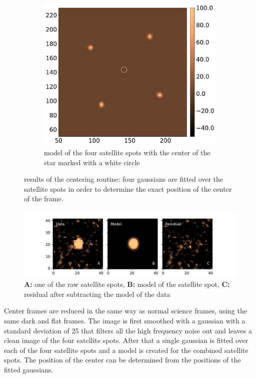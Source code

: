 \documentclass[twoside,single,12pt]{lion-msc}
\begin{document}
\begin{figure}[!t]
\begin{subfigure}{.48\textwidth}
  \includegraphics[width=1\linewidth]{centermodel}%
  \caption{model of the four satellite spots with the center of the star marked with a white circle}
  \label{fig:centermodel}
\end{subfigure}
\caption{results of the centering routine: four gaussians are fitted over the satellite spots in order to determine the exact position of the center of the frame.}
\end{figure}

\begin{figure}[!b]
\centering
\vspace{-0.5cm}
\includegraphics[trim={2cm 0cm 0cm 0cm},clip,width = 1.1\textwidth]{resultmodel}
\caption{\textbf{A:} one of the raw satellite spots, \textbf{B:} model of the satellite spot, \textbf{C:} residual after subtracting the model of the data} 
\label{fig:resultmodel}
\vspace{-0.3cm}
\end{figure}
\bigskip
Center frames are reduced in the same way as normal science frames, using the same dark and flat frames. The image is first smoothed with a gaussian with a standard deviation of 25 that filters all the high frequency noise out and leaves a clean image of the four satellite spots. After that a single gaussian is fitted over each of the four satellite spots and a model is created for the combined satellite spots. The position of the center can be determined from the positions of the fitted gaussians. 
\bigskip
\end{document}
